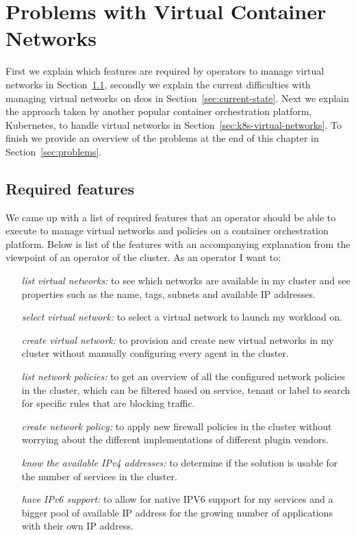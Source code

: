 \chapter{Problems with Virtual Container Networks}
\label{chap:research}
 First we explain which features are required by operators to manage virtual networks in Section~\ref{sec:required-features}, secondly we explain the current difficulties with managing virtual networks on \gls{dcos} in Section~\ref{sec:current-state}. Next we explain the approach taken by another popular container orchestration platform, Kubernetes, to handle virtual networks in Section~\ref{sec:k8s-virtual-networks}. To finish we provide an overview of the problems at the end of this chapter in Section~\ref{sec:problems}.

\section{Required features}
\label{sec:required-features}
We came up with a list of required features that an operator should be able to execute to manage virtual networks and policies on a container orchestration platform. Below is list of the features with an accompanying explanation from the viewpoint of an operator of the cluster. As an operator I want to:
\begin{itemize}
    \item[\textit{list virtual networks:}] to see which networks are available in my cluster and see properties such as the name, tags, subnets and available IP addresses.
    \item[\textit{select virtual network:}] to select a virtual network to launch my workload on.
    \item[\textit{create virtual network:}] to provision and create new virtual networks in my cluster without manually configuring every agent in the cluster.
    \item[\textit{list network policies:}] to get an overview of all the configured network policies in the cluster, which can be filtered based on service, tenant or label to search for specific rules that are blocking traffic.
    \item[\textit{create network policy:}] to apply new firewall policies in the cluster without worrying about the different implementations of different plugin vendors.
    \item[\textit{know the available IPv4 addresses:}] to determine if the solution is usable for the number of services in the cluster.
    \item[\textit{have IPv6 support:}] to allow for native IPV6 support for my services and a bigger pool of available IP address for the growing number of applications with their own IP address.
\end{itemize}

